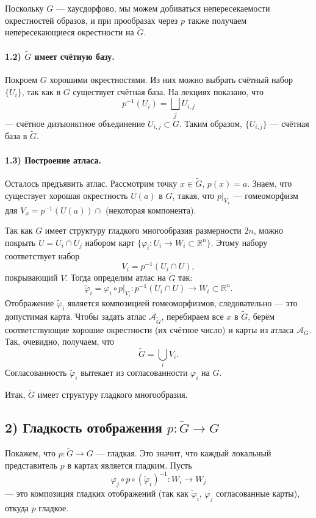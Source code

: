 \documentclass{article}
\begin{document}
Поскольку $G$ --- хаусдорфово, мы можем добиваться непересекаемости окрестностей образов, и при прообразах через $p$ также получаем непересекающиеся окрестности на $\widetilde{G}$.

\paragraph{1.2) $\widetilde{G}$ имеет счётную базу.}
Покроем $G$ хорошими окрестностями. Из них можно выбрать счётный набор $\{U_i\}$, так как в $G$ существует счётная база. На лекциях показано, что
\[
p^{-1}(U_i) = \bigsqcup_j U_{i,j}
\]
--- счётное дизъюнктное объединение $U_{i,j} \subset \widetilde{G}$. Таким образом, $\{U_{i,j}\}$ --- счётная база в $\widetilde{G}$.

\paragraph{1.3) Построение атласа.}
Осталось предъявить атлас. Рассмотрим точку $x \in \widetilde{G}$, $p(x) = a$. Знаем, что существует хорошая окрестность $U(a)$ в $G$, такая, что $p \lvert_{V_x}$ --- гомеоморфизм для $V_x = p^{-1}(U(a)) \cap$ (некоторая компонента).

Так как $G$ имеет структуру гладкого многообразия размерности $2n$, можно покрыть $U = U_i \cap U_j$ набором карт $\{\varphi_i: U_i \to W_i \subset \mathbb{R}^n\}$. Этому набору соответствует набор
\[
V_i = p^{-1}(U_i \cap U),
\]
покрывающий $V$. Тогда определим атлас на $\widetilde{G}$ так:
\[
\widetilde{\varphi}_i = \varphi_i \circ p \lvert_{V_i} \colon
p^{-1}(U_i \cap U) \to W_i \subset \mathbb{R}^n.
\]
Отображение $\widetilde{\varphi}_i$ является композицией гомеоморфизмов, следовательно --- это допустимая карта. Чтобы задать атлас $\mathcal{A}_{\widetilde{G}}$, перебираем все $x$ в $\widetilde{G}$, берём соответствующие хорошие окрестности (их счётное число) и карты из атласа $\mathcal{A}_G$. Так, очевидно, получаем, что
\[
\widetilde{G} = \bigcup_i V_i.
\]
Согласованность $\widetilde{\varphi}_i$ вытекает из согласованности $\varphi_i$ на $G$.

Итак, $\widetilde{G}$ имеет структуру гладкого многообразия.

\subsection*{2) Гладкость отображения $p \colon \widetilde{G} \to G$}
Покажем, что $p \colon \widetilde{G} \to G$ --- гладкая. Это значит, что каждый локальный представитель $p$ в картах является гладким. Пусть
\[
\varphi_j \circ p \circ (\widetilde{\varphi}_i)^{-1} \colon W_i \to W_j
\]
--- это композиция гладких отображений (так как $\widetilde{\varphi}_i$, $\varphi_j$ согласованные карты), откуда $p$ гладкое.
\end{document}
